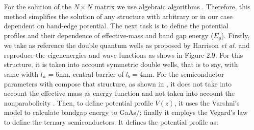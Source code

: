 For the solution of the $N\times N$ matrix we use algebraic algorithms \cite{laug1999lapack,harris2020array}. Therefore, this method simplifies the solution of any structure with arbitrary or in our case dependent on band-edge potential. The next task is to define the potential profiles and their dependence of effective-mass
and band gap energy ($E_g$). Firstly, we take as reference the double quantum wells as proposed
by Harrison \textit{et al.} \cite{harrison2016chap3} and reproduce the eigenenergies and wave functions as shows in
Figure 2.9. For this structure, it is taken into account symmetric double wells, that is to say,
with same width $l_w = 6$nm,  central barrier of $l_{b} = 4$nm. For the semiconductor
parameters with compose that structure, as shown in ,
it does not take into account the effective mass as energy function and not taken into account
the nonparabolicity \cite{nelson1987band,cooper2010finite}. Then, to define potential profile $V(z)$,  it uses the Varshni's model \cite{varshni1967temperature} to calculate bandgap energy to GaAs/\algaas \cite{vurgaftman2001bandparameters,molenk1988determination,adachi2009properties,lew2009heterostructuresbasicformalism}; finally it
employs the Vegard's law to define the ternary semiconductors\cite{donmez2012study,zhou2001deviation}. It defines the
potential profile as:
